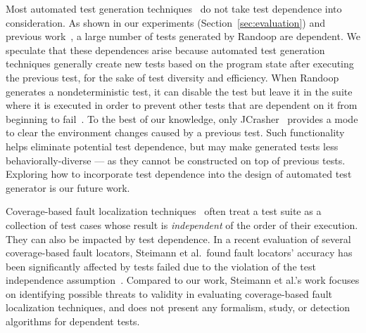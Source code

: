

Most automated test generation
techniques~\cite{PachecoLET2007, Wang:2007:AGC,
ZhangSBE2011} do not take test dependence
into consideration. As shown in our experiments
(Section~\ref{sec:evaluation}) and previous work~\cite{RobinsonEPAL2011},
a large number of tests generated by Randoop are dependent.
We speculate that these dependences arise because automated
test generation techniques generally create new tests
based on the program state after executing the previous test,
for the sake of test diversity and efficiency. 
When Randoop generates a nondeterministic test, it can disable the test but
leave it in the suite where it is executed in order to prevent other tests
that are dependent on it from beginning to fail~\cite{RobinsonEPAL2011}.
To the best of our knowledge, only JCrasher~\cite{Csallner:2004}
provides a mode to clear the environment changes caused
by a previous test. Such functionality helps eliminate
potential test dependence, but may make generated
tests less behaviorally-diverse --- as they cannot be constructed
on top of previous tests. Exploring how to
incorporate test dependence into the design of automated
test generator is our future work.

Coverage-based fault localization techniques~\cite{Jones:2002:VTI}
often treat a test suite as a collection of test cases
whose result is \textit{independent} of the order of their
execution. They can also be impacted by test dependence.
In a recent evaluation of several coverage-based fault locators,
 Steimann et al.\ found fault locators' accuracy has been significantly
 affected by tests failed due to the violation of the test
 independence assumption~\cite{Steimann:2013}. 
 Compared to our work, Steimann et al.'s
 work focuses on identifying possible threats to validity
 in evaluating coverage-based fault localization techniques, and does
 not present any formalism, study, or detection algorithms
 for dependent tests.


